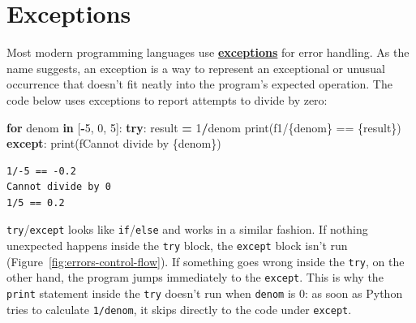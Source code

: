 \documentclass[
]{krantz}
\makeatletter
\newenvironment{Shaded}{\begin{snugshade}}{\end{snugshade}}
\newcommand{\BuiltInTok}[1]{#1}
\newcommand{\ControlFlowTok}[1]{\textcolor[rgb]{0.13,0.29,0.53}{\textbf{#1}}}
\newcommand{\DecValTok}[1]{\textcolor[rgb]{0.00,0.00,0.81}{#1}}
\newcommand{\KeywordTok}[1]{\textcolor[rgb]{0.13,0.29,0.53}{\textbf{#1}}}
\newcommand{\NormalTok}[1]{#1}
\newcommand{\OperatorTok}[1]{\textcolor[rgb]{0.81,0.36,0.00}{\textbf{#1}}}
\newcommand{\SpecialCharTok}[1]{\textcolor[rgb]{0.00,0.00,0.00}{#1}}
\newcommand{\SpecialStringTok}[1]{\textcolor[rgb]{0.31,0.60,0.02}{#1}}
\newenvironment{kframe}{%
\medskip{}
\setlength{\fboxsep}{.8em}
 \def\at@end@of@kframe{}%
 \ifinner\ifhmode%
  \def\at@end@of@kframe{\end{minipage}}%
  \begin{minipage}{\columnwidth}%
 \fi\fi%
 \def\FrameCommand##1{\hskip\@totalleftmargin \hskip-\fboxsep
 \colorbox{shadecolor}{##1}\hskip-\fboxsep
     \hskip-\linewidth \hskip-\@totalleftmargin \hskip\columnwidth}%
 \MakeFramed {\advance\hsize-\width
   \@totalleftmargin\z@ \linewidth\hsize
   \@setminipage}}%
 {\par\unskip\endMakeFramed%
 \at@end@of@kframe}
\renewenvironment{Shaded}{\begin{kframe}}{\end{kframe}}
\newcommand{\gref}[2]{\hyperlink{#2}{\textbf{#1}}}
\makeatother
\begin{document}
\hypertarget{errors-exceptions}{%
\section{Exceptions}\label{errors-exceptions}}

Most modern programming languages use \gref{exceptions}{exception} for error handling.
As the name suggests,
an exception is a way to represent an exceptional or unusual occurrence
that doesn't fit neatly into the program's expected operation.
The code below uses exceptions to report attempts to divide by zero:

\begin{Shaded}
\begin{Highlighting}[]
\ControlFlowTok{for}\NormalTok{ denom }\KeywordTok{in}\NormalTok{ [}\OperatorTok{{-}}\DecValTok{5}\NormalTok{, }\DecValTok{0}\NormalTok{, }\DecValTok{5}\NormalTok{]:}
    \ControlFlowTok{try}\NormalTok{:}
\NormalTok{        result }\OperatorTok{=} \DecValTok{1}\OperatorTok{/}\NormalTok{denom}
        \BuiltInTok{print}\NormalTok{(}\SpecialStringTok{f\textquotesingle{}1/}\SpecialCharTok{\{}\NormalTok{denom}\SpecialCharTok{\}}\SpecialStringTok{ == }\SpecialCharTok{\{}\NormalTok{result}\SpecialCharTok{\}}\SpecialStringTok{\textquotesingle{}}\NormalTok{)}
    \ControlFlowTok{except}\NormalTok{:}
        \BuiltInTok{print}\NormalTok{(}\SpecialStringTok{f\textquotesingle{}Cannot divide by }\SpecialCharTok{\{}\NormalTok{denom}\SpecialCharTok{\}}\SpecialStringTok{\textquotesingle{}}\NormalTok{)}
\end{Highlighting}
\end{Shaded}

\begin{verbatim}
1/-5 == -0.2
Cannot divide by 0
1/5 == 0.2
\end{verbatim}

\texttt{try}/\texttt{except} looks like \texttt{if}/\texttt{else} and works in a similar fashion.
If nothing unexpected happens inside the \texttt{try} block,
the \texttt{except} block isn't run (Figure~\ref{fig:errors-control-flow}).
If something goes wrong inside the \texttt{try},
on the other hand,
the program jumps immediately to the \texttt{except}.
This is why the \texttt{print} statement inside the \texttt{try} doesn't run when \texttt{denom} is 0:
as soon as Python tries to calculate \texttt{1/denom},
it skips directly to the code under \texttt{except}.
\end{document}
